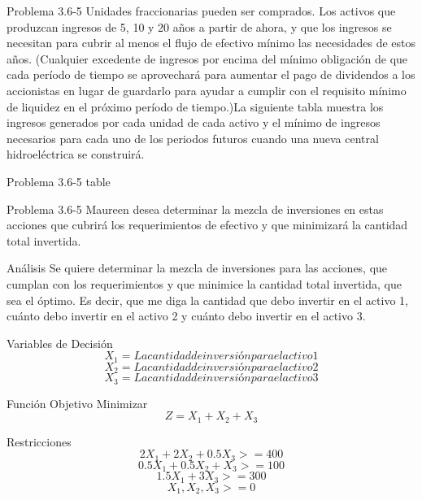 \documentclass{beamer}
\begin{document}
\begin{frame}[t,fragile]{Problema 3.6-5 }
Unidades fraccionarias pueden ser comprados. Los activos que produzcan ingresos de 5, 10 y 20 años a partir de ahora, y que los ingresos se necesitan para cubrir al menos el flujo de efectivo mínimo las necesidades de estos años. (Cualquier excedente de ingresos por encima del mínimo obligación de que cada período de tiempo se aprovechará para aumentar el pago de dividendos a los accionistas en lugar de guardarlo para ayudar a cumplir con el requisito mínimo de liquidez en el próximo período de tiempo.)La siguiente tabla muestra  los ingresos generados por cada unidad de cada activo y el  mínimo de ingresos necesarios para cada uno de los periodos futuros cuando una nueva central hidroeléctrica se construirá.
\end{frame}
\begin{frame}[t,fragile]{Problema 3.6-5 }
table
\end{frame}
\begin{frame}[t,fragile]{Problema 3.6-5 }
Maureen desea determinar la mezcla de inversiones en estas acciones que cubrirá los requerimientos de efectivo y que minimizará la cantidad total invertida.
\end{frame}

\begin{frame}[fragile]{Análisis}
Se quiere determinar la mezcla de inversiones  para las acciones, que cumplan con los requerimientos  y que minimice la cantidad total invertida, que sea el óptimo. Es decir, que me diga la cantidad que debo invertir en el activo 1, cuánto debo invertir en el activo 2 y cuánto debo invertir en el activo 3.

\end{frame}

\begin{frame}[fragile]{Variables de Decisión}
\[X_{1} = La cantidad de inversión para el activo 1\]
\[X_{2} = La cantidad de inversión para el activo 2\]
\[X_{3} = La cantidad de inversión para el activo 3\]

\end{frame}

\begin{frame}[fragile]{Función Objetivo}
Minimizar\\
\[Z = X_{1} + X_{2} + X_{3}\]
\end{frame}

\begin{frame}[fragile]{Restricciones}
\[2X_{1} + 2X_{2} +0.5X_{3}  >= 400\]
\[0.5X_{1} + 0.5X_{2} +X_{3} >= 100\]
\[1.5 X_{1} + 3X_{3} >= 300\]
\[X_{1}, X_{2}, X_{3} >= 0\]

\end{frame}
\end{document}
